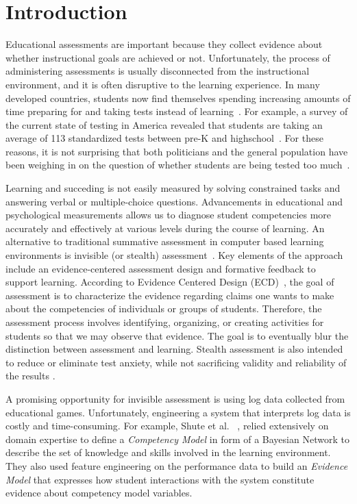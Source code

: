 \documentclass{sigchi}
\begin{document}
{}

\section{Introduction}
Educational assessments are important because they collect evidence about  whether instructional goals are achieved or not.
Unfortunately, the process of  administering assessments is usually disconnected from the instructional environment, and  it is often  disruptive to the learning experience. 
In many developed countries, students now find themselves spending increasing amounts of time preparing for and taking tests instead of learning~\cite{hofman2015re}.
For example, a  survey of the current state of testing in America revealed that students are taking an average of 113 standardized tests between pre-K and highschool~\cite{lazarin2014testing}. 
For these reasons, it is not surprising that both politicians and the general population have been weighing in on the question of whether students are being tested too much~\cite{lazarin2014testing}.

Learning and succeding is not easily measured by solving constrained tasks and answering verbal or multiple-choice questions.
Advancements in educational and psychological measurements allows us to diagnose student competencies more accurately and effectively at various levels during the course of learning.
An alternative to traditional summative assessment in computer based learning environments is invisible (or stealth) assessment~\cite{shute2013stealth}.
Key elements of the approach include an evidence-centered assessment design and formative feedback to support learning.
According to Evidence Centered Design (ECD)~\cite{mislevy2012design}, the goal of assessment is to characterize the evidence regarding claims one wants to make about the competencies of individuals or groups of students.
Therefore, the assessment process involves identifying, organizing, or creating activities for students so that we may observe that evidence.
The goal is to eventually blur the distinction between assessment and learning.
Stealth assessment is also intended to reduce or eliminate test anxiety, while not sacrificing validity and reliability of the results \cite{shute2008you}.

A promising opportunity for invisible assessment is using log data collected from educational games.
Unfortunately, engineering a system that interprets log data is costly and time-consuming.
For example, Shute et al. ~\cite{shute2013stealth, shute2009melding}, relied extensively on domain expertise to define a \textit{Competency Model} in form of a Bayesian Network to describe the set of knowledge and skills involved in the learning environment.
They also used feature engineering on the performance data to build an \textit{Evidence Model} that expresses how student interactions with the system constitute evidence about competency model variables.
\end{document}
